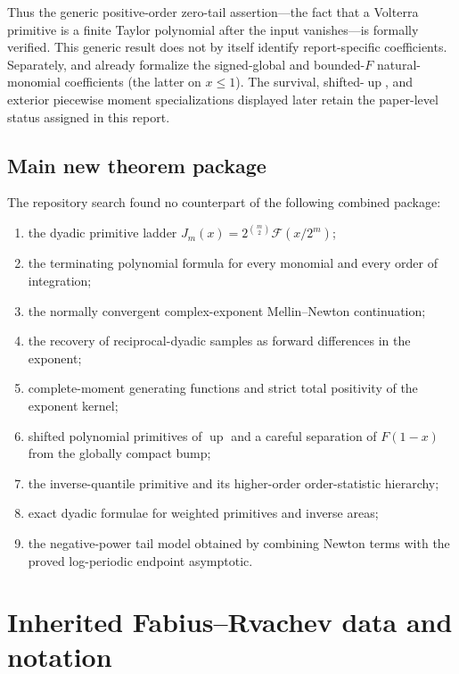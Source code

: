 \documentclass[11pt,oneside]{article}
\numberwithin{equation}{section}
\theoremstyle{definition}
\theoremstyle{remark}
\newcommand{\Up}{\operatorname{up}}
\begin{document}
Thus the generic positive-order zero-tail assertion---the fact that a Volterra primitive is
a finite Taylor polynomial after the input vanishes---is formally verified.  This generic
result does not by itself identify report-specific coefficients.  Separately,
 and
 already formalize the signed-global
and bounded-$F$ natural-monomial coefficients (the latter on $x\le1$).  The survival,
shifted-\(\Up\), and exterior piecewise moment specializations displayed later retain the
paper-level status assigned in this report.

\subsection{Main new theorem package}

The repository search found no counterpart of the following combined package:

\begin{enumerate}
\item the dyadic primitive ladder $J_m(x)=2^{\binom m2}\mathcal F(x/2^m)$;
\item the terminating polynomial formula for every monomial and every order of integration;
\item the normally convergent complex-exponent Mellin--Newton continuation;
\item the recovery of reciprocal-dyadic samples as forward differences in the exponent;
\item complete-moment generating functions and strict total positivity of the exponent kernel;
\item shifted polynomial primitives of $\Up$ and a careful separation of $F(1-x)$ from the
      globally compact bump;
\item the inverse-quantile primitive and its higher-order order-statistic hierarchy;
\item exact dyadic formulae for weighted primitives and inverse areas;
\item the negative-power tail model obtained by combining Newton terms with the proved
      log-periodic endpoint asymptotic.
\end{enumerate}

\section{Inherited Fabius--Rvachev data and notation}
\label{sec:background}
\end{document}
